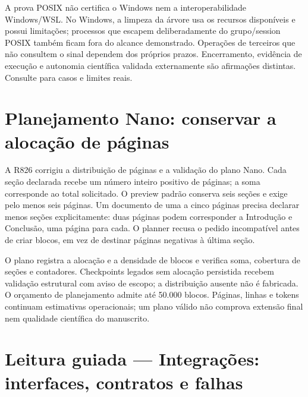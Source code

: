 \begin{limite}
A prova POSIX não certifica o Windows nem a interoperabilidade Windows/WSL.
No Windows, a limpeza da árvore usa os recursos disponíveis e possui limitações;
processos que escapem deliberadamente do grupo/session POSIX também ficam fora
do alcance demonstrado. Operações de terceiros que não consultem o sinal
dependem dos próprios prazos. Encerramento, evidência de execução e autonomia
científica validada externamente são afirmações distintas. Consulte
 para casos e limites reais.
\end{limite}
\clearpage
\section{Planejamento Nano: conservar a alocação de páginas}

\begin{metodo}
A R826 corrigiu a distribuição de páginas e a validação do plano Nano. Cada
seção declarada recebe um número inteiro positivo de páginas; a soma corresponde
ao total solicitado. O preview padrão conserva seis seções e exige pelo menos
seis páginas. Um documento de uma a cinco páginas precisa declarar menos seções
explicitamente: duas páginas podem corresponder a Introdução e Conclusão, uma
página para cada. O planner recusa o pedido incompatível antes de criar blocos,
em vez de destinar páginas negativas à última seção.
\end{metodo}

\begin{limite}
O plano registra a alocação e a densidade de blocos e verifica soma, cobertura
de seções e contadores. Checkpoints legados sem alocação persistida recebem
validação estrutural com aviso de escopo; a distribuição ausente não é
fabricada. O orçamento de planejamento admite até 50.000 blocos. Páginas,
linhas e tokens continuam estimativas operacionais; um plano válido não comprova
extensão final nem qualidade científica do manuscrito.
\end{limite}

\section[Leitura guiada]{Leitura guiada — Integrações: interfaces, contratos e falhas}


